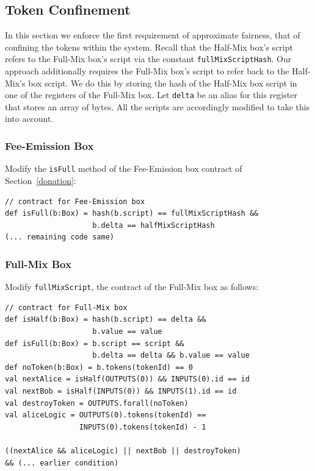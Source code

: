 \documentclass[11pt]{article}
\begin{document}
\subsection{Token Confinement}

In this section we enforce the first requirement of approximate fairness, that of confining the tokens within the system. 
Recall that the Half-Mix box's script refers to the Full-Mix box's script via the constant \texttt{fullMixScriptHash}. Our approach additionally requires the Full-Mix box's script to refer back to the Half-Mix's box script. We do this by storing the hash of the Half-Mix box script in one of the registers of the Full-Mix box. Let \texttt{delta} be an alias for this register that stores an array of bytes. All the scripts are accordingly modified to take this into account. 

\subsubsection{Fee-Emission Box}
Modify the \texttt{isFull} method of the Fee-Emission box contract of Section~\ref{donation}: 

\begin{Verbatim}[frame=single]
// contract for Fee-Emission box
def isFull(b:Box) = hash(b.script) == fullMixScriptHash && 
                    b.delta == halfMixScriptHash
(... remaining code same)                    
\end{Verbatim}

\subsubsection{Full-Mix Box}

Modify \texttt{fullMixScript}, the contract of the Full-Mix box as follows: 
\begin{Verbatim}[frame=single]
// contract for Full-Mix box
def isHalf(b:Box) = hash(b.script) == delta && 
                    b.value == value
def isFull(b:Box) = b.script == script &&
                    b.delta == delta && b.value == value
def noToken(b:Box) = b.tokens(tokenId) == 0
val nextAlice = isHalf(OUTPUTS(0)) && INPUTS(0).id == id
val nextBob = isHalf(INPUTS(0)) && INPUTS(1).id == id
val destroyToken = OUTPUTS.forall(noToken)
val aliceLogic = OUTPUTS(0).tokens(tokenId) == 
                 INPUTS(0).tokens(tokenId) - 1

((nextAlice && aliceLogic) || nextBob || destroyToken) 
&& (... earlier condition)
\end{Verbatim}
\end{document}

